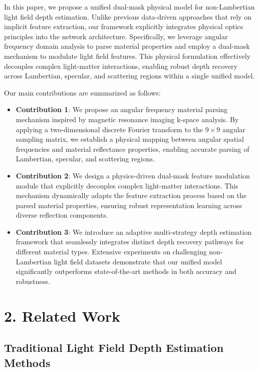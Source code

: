 \documentclass[lettersize,journal]{IEEEtran}
\begin{document}
In this paper, we propose a unified dual-mask physical model for non-Lambertian light field depth estimation. Unlike previous data-driven approaches that rely on implicit feature extraction, our framework explicitly integrates physical optics principles into the network architecture. Specifically, we leverage angular frequency domain analysis to parse material properties and employ a dual-mask mechanism to modulate light field features. This physical formulation effectively decouples complex light-matter interactions, enabling robust depth recovery across Lambertian, specular, and scattering regions within a single unified model.

Our main contributions are summarized as follows:

\begin{itemize}
  \item \textbf{Contribution 1}: We propose an angular frequency material parsing mechanism inspired by magnetic resonance imaging k-space analysis. By applying a two-dimensional discrete Fourier transform to the $9 \times 9$ angular sampling matrix, we establish a physical mapping between angular spatial frequencies and material reflectance properties, enabling accurate parsing of Lambertian, specular, and scattering regions.
  \item \textbf{Contribution 2}: We design a physics-driven dual-mask feature modulation module that explicitly decouples complex light-matter interactions. This mechanism dynamically adapts the feature extraction process based on the parsed material properties, ensuring robust representation learning across diverse reflection components.
  \item \textbf{Contribution 3}: We introduce an adaptive multi-strategy depth estimation framework that seamlessly integrates distinct depth recovery pathways for different material types. Extensive experiments on challenging non-Lambertian light field datasets demonstrate that our unified model significantly outperforms state-of-the-art methods in both accuracy and robustness.
\end{itemize}

\section{2. Related Work}

\subsection{Traditional Light Field Depth Estimation Methods}
\end{document}
